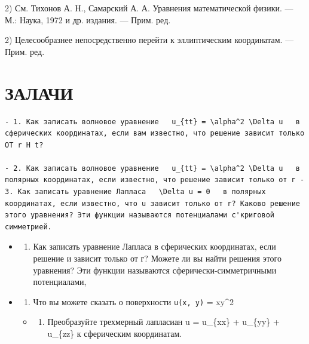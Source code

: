 \documentclass[
  ukrainian,
]{article}
\providecommand{\tightlist}{%
  \setlength{\itemsep}{0pt}\setlength{\parskip}{0pt}}
\begin{document}
2) См. Тихонов А. Н., Самарский А. А. Уравнения математической физики.
--- М.: Наука, 1972 и др. издания. --- Прим. ред.

2) Целесообразнее непосредственно перейти к эллиптическим координатам.
--- Прим. ред.

\section{ЗАЛАЧИ}\label{ux437ux430ux43bux430ux447ux438}

\begin{verbatim}
- 1. Как записать волновое уравнение   u_{tt} = \alpha^2 \Delta u   в сферических координатах, если вам известно, что решение зависит только OT r H t?

- 2. Как записать волновое уравнение   u_{tt} = \alpha^2 \Delta u   в полярных координатах, если известно, что решение зависит только от г - 3. Как записать уравнение Лапласа   \Delta u = 0   в полярных координатах, если известно, что u зависит только от r? Каково решение этого уравнения? Эти функции называются потенциалами с'криговой симметрией.
\end{verbatim}

\begin{itemize}
\item
  \begin{enumerate}
  \def\labelenumi{\arabic{enumi}.}
  \setcounter{enumi}{3}
  \tightlist
  \item
    Как записать уравнение Лапласа в сферических координатах, если
    решение и зависит только от г? Можете ли вы найти решения этого
    уравнения? Эти функции называются сферически-симметричными
    потенциалами,
  \end{enumerate}
\item
  \begin{enumerate}
  \def\labelenumi{\arabic{enumi}.}
  \setcounter{enumi}{4}
  \tightlist
  \item
    Что вы можете сказать о поверхности \texttt{u(x,\ y)} = xy\^{}2
  \end{enumerate}

  \begin{itemize}
  \tightlist
  \item
    \begin{enumerate}
    \def\labelenumi{\arabic{enumi}.}
    \setcounter{enumi}{5}
    \tightlist
    \item
      Преобразуйте трехмерный лапласиан \Delta u = u\_\{xx\} + u\_\{yy\}
      + u\_\{zz\} к сферическим координатам.
    \end{enumerate}
  \end{itemize}
\end{itemize}
\end{document}
